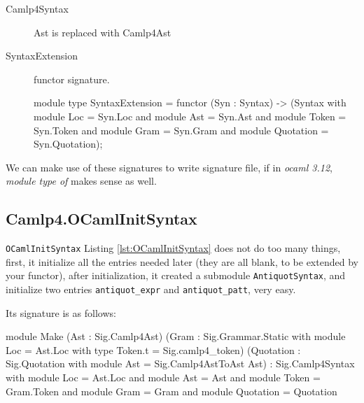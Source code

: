 \begin{description}
\item[Camlp4Syntax] Ast is replaced with Camlp4Ast

\item[SyntaxExtension] functor signature.

  \begin{ocamlcode}
module type SyntaxExtension = functor (Syn : Syntax)
                    -> (Syntax with module Loc            = Syn.Loc
                                and module Ast            = Syn.Ast
                                and module Token          = Syn.Token
                                and module Gram           = Syn.Gram
                                and module Quotation      = Syn.Quotation);
    
  \end{ocamlcode}
\end{description}


We can make use of these signatures to write signature file, if in
\textit{ocaml 3.12}, \textit{module type of} makes sense as well.




\subsection{Camlp4.OCamlInitSyntax}

\verb|OCamlInitSyntax| Listing \ref{lst:OCamlInitSyntax} does not do
too many things, first, it initialize all the entries needed later
(they are all blank, to be extended by your functor), after
initialization, it created a submodule \verb|AntiquotSyntax|, and
initialize two entries \verb|antiquot_expr| and \verb|antiquot_patt|,
very easy.

Its signature is as follows:

\begin{ocamlcode}
module Make (Ast     : Sig.Camlp4Ast)
            (Gram    : Sig.Grammar.Static with module Loc = Ast.Loc
                        with type Token.t = Sig.camlp4_token)
           (Quotation : Sig.Quotation with
                        module Ast = Sig.Camlp4AstToAst Ast)
: Sig.Camlp4Syntax with module Loc = Ast.Loc
                    and module Ast = Ast
                    and module Token = Gram.Token
                    and module Gram = Gram
                    and module Quotation = Quotation  
\end{ocamlcode}
                  
\inputminted[fontsize=\scriptsize,
firstline=55]{ocaml}{code/camlp4/source/precast.ml}

